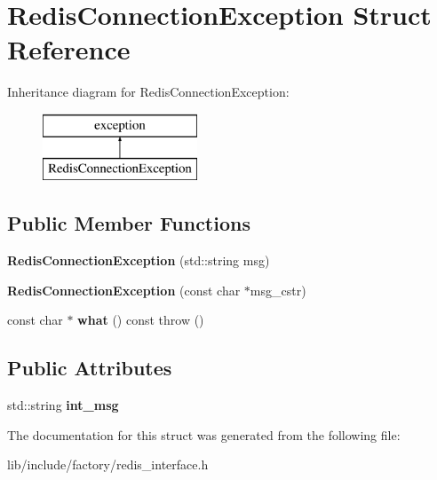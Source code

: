 \hypertarget{structRedisConnectionException}{\section{Redis\-Connection\-Exception Struct Reference}
\label{structRedisConnectionException}
}
Inheritance diagram for Redis\-Connection\-Exception\-:\begin{figure}[H]
\begin{center}
\leavevmode
\includegraphics[height=2.000000cm]{structRedisConnectionException}
\end{center}
\end{figure}
\subsection*{Public Member Functions}
\begin{DoxyCompactItemize}
\item 
\hypertarget{structRedisConnectionException_a1a28a564f37ca6c032222fc57611fe7d}{{\bfseries Redis\-Connection\-Exception} (std\-::string msg)}\label{structRedisConnectionException_a1a28a564f37ca6c032222fc57611fe7d}

\item 
\hypertarget{structRedisConnectionException_a5af84b976ba7c84d4891c8b42d0c0b34}{{\bfseries Redis\-Connection\-Exception} (const char $\ast$msg\-\_\-cstr)}\label{structRedisConnectionException_a5af84b976ba7c84d4891c8b42d0c0b34}

\item 
\hypertarget{structRedisConnectionException_a309897cb6e68eea573b2db478543cb16}{const char $\ast$ {\bfseries what} () const   throw ()}\label{structRedisConnectionException_a309897cb6e68eea573b2db478543cb16}

\end{DoxyCompactItemize}
\subsection*{Public Attributes}
\begin{DoxyCompactItemize}
\item 
\hypertarget{structRedisConnectionException_a95af5cf7df2c6dda75b37574a6cafba4}{std\-::string {\bfseries int\-\_\-msg}}\label{structRedisConnectionException_a95af5cf7df2c6dda75b37574a6cafba4}

\end{DoxyCompactItemize}


The documentation for this struct was generated from the following file\-:\begin{DoxyCompactItemize}
\item 
lib/include/factory/redis\-\_\-interface.\-h\end{DoxyCompactItemize}
